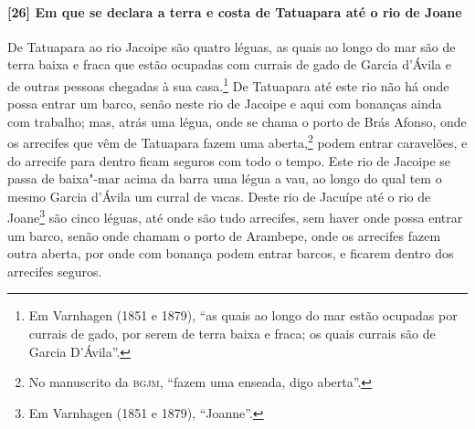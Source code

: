 \paragraph{[26] Em que se declara a terra e costa de Tatuapara até o rio de Joane} \quad
De Tatuapara ao rio Jacoipe são quatro léguas, as quais ao longo do mar são de terra baixa
e fraca que estão ocupadas com currais de gado de Garcia d'Ávila e de outras pessoas
chegadas à sua casa.\footnote{ Em Varnhagen (1851 e 1879), ``as quais ao longo do mar
estão ocupadas por currais de gado, por serem de terra baixa e fraca; os quais currais são
de Garcia D'Ávila''.} De Tatuapara até este rio não há onde possa entrar um barco, senão
neste rio de Jacoipe e aqui com bonanças ainda com trabalho; mas, atrás uma légua, onde se
chama o porto de Brás Afonso, onde os arrecifes que vêm de Tatuapara fazem uma
aberta,\footnote{ No manuscrito da \textsc{bgjm}, ``fazem uma enseada, digo aberta''.}
podem entrar caravelões, e do arrecife para dentro ficam seguros com todo o tempo. Este
rio de Jacoipe se passa de baixa"-mar acima da barra uma légua a vau, ao longo do qual tem
o mesmo Garcia d'Ávila um curral de vacas. Deste rio de Jacuípe até o rio de
Joane\footnote{ Em Varnhagen (1851 e 1879), ``Joanne''.} são cinco léguas, até onde são
tudo arrecifes, sem haver onde possa entrar um barco, senão onde chamam o porto de
Arambepe, onde os arrecifes fazem outra aberta, por onde com bonança podem entrar barcos,
e ficarem dentro dos arrecifes seguros.

